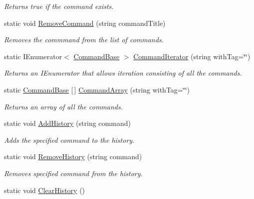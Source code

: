 \begin{DoxyCompactItemize}
\begin{DoxyCompactList}\small\item\em Returns true if the command exists. \end{DoxyCompactList}\item 
static void \hyperlink{class_developer_console_1_1_dev_console_aa8f421feb7ebe03f0575a1ccf5cbe13a}{Remove\+Command} (string command\+Title)
\begin{DoxyCompactList}\small\item\em Removes the commmand from the list of commands. \end{DoxyCompactList}\item 
static I\+Enumerator$<$ \hyperlink{class_developer_console_1_1_core_1_1_command_base}{Command\+Base} $>$ \hyperlink{class_developer_console_1_1_dev_console_ab2a1e0c75f816fabb91576e1dd3c9017}{Command\+Iterator} (string with\+Tag=\char`\"{}\char`\"{})
\begin{DoxyCompactList}\small\item\em Returns an I\+Enumerator that allows iteration consisting of all the commands. \end{DoxyCompactList}\item 
static \hyperlink{class_developer_console_1_1_core_1_1_command_base}{Command\+Base} \mbox{[}$\,$\mbox{]} \hyperlink{class_developer_console_1_1_dev_console_a9a4e69ab3f7db22df4a8ee920de6ecb7}{Command\+Array} (string with\+Tag=\char`\"{}\char`\"{})
\begin{DoxyCompactList}\small\item\em Returns an array of all the commands. \end{DoxyCompactList}\item 
static void \hyperlink{class_developer_console_1_1_dev_console_a08b3c37a06bcfbf5a0b82e7cd05a1034}{Add\+History} (string command)
\begin{DoxyCompactList}\small\item\em Adds the specified command to the history. \end{DoxyCompactList}\item 
static void \hyperlink{class_developer_console_1_1_dev_console_a55e287794c05ce2ff7e65153f71f7a1a}{Remove\+History} (string command)
\begin{DoxyCompactList}\small\item\em Removes specified command from the history. \end{DoxyCompactList}\item 
static void \hyperlink{class_developer_console_1_1_dev_console_a4aa582bf50489304d187c5ca7acb5f22}{Clear\+History} ()

\end{DoxyCompactItemize}
